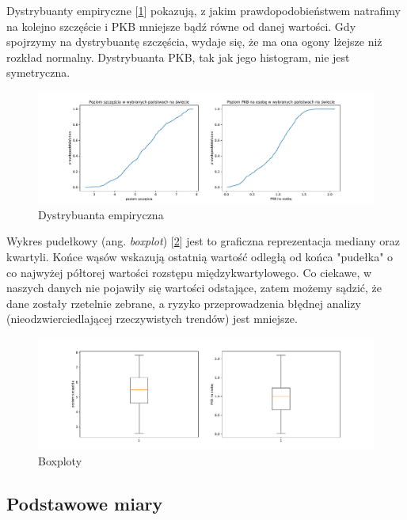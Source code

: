 \documentclass{article}
\theoremstyle{break}
\begin{document}
Dystrybuanty empiryczne [\ref{fig:distr}] pokazują, z jakim prawdopodobieństwem natrafimy na kolejno szczęście i PKB mniejsze bądź równe od danej wartości. Gdy spojrzymy na dystrybuantę szczęścia, wydaje się, że ma ona ogony lżejsze niż rozkład normalny. Dystrybuanta PKB, tak jak jego histogram, nie jest symetryczna. 

\begin{figure}[H]
	\begin{center}
		\includegraphics[scale=0.43]{distr.pdf}
		\caption{Dystrybuanta empiryczna}
		\label{fig:distr}
	\end{center}
\end{figure}

Wykres pudełkowy (ang. \textit{boxplot}) [\ref{fig:box}] jest to graficzna reprezentacja mediany oraz kwartyli. Końce wąsów wskazują ostatnią wartość odległą od końca "pudełka" o co najwyżej półtorej wartości rozstępu międzykwartylowego. Co ciekawe, w naszych danych nie pojawiły się wartości odstające, zatem możemy sądzić, że dane zostały rzetelnie zebrane, a ryzyko przeprowadzenia błędnej analizy (nieodzwierciedlającej rzeczywistych trendów) jest mniejsze.

\begin{figure}[H]
	\begin{center}
		\includegraphics[scale=0.43]{box.pdf}
		\caption{Boxploty}
		\label{fig:box}
	\end{center}
\end{figure}

\subsection{Podstawowe miary}
\end{document}
